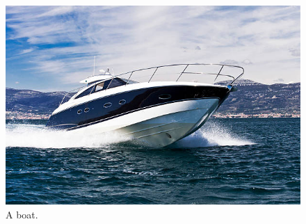 \documentclass{article}
\begin{document}
	\begin{figure}
		\includegraphics[width=\linewidth]{boat.jpg}
		\caption{A boat.}
		\label{fig:boat1}
	\end{figure}
\end{document}
